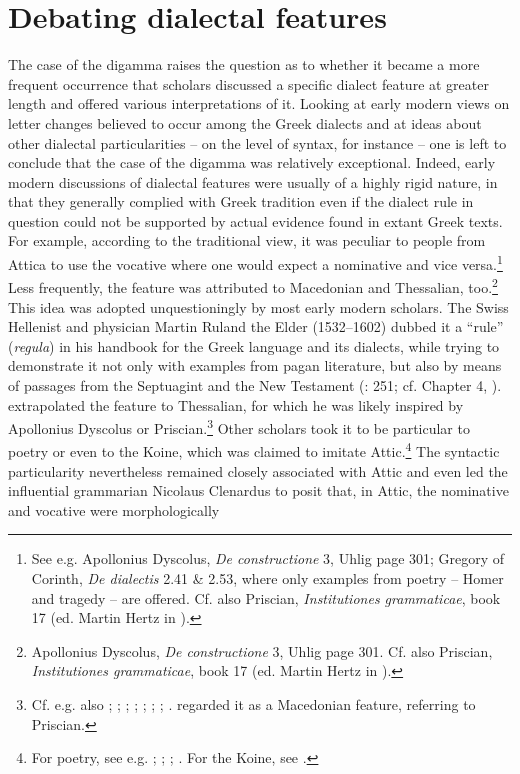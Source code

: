 \section{Debating dialectal features}\label{sec:6.4}

The case of the digamma raises the question as to whether it became a more frequent occurrence that scholars discussed a specific dialect feature at greater length and offered various interpretations of it. Looking at early modern views on letter changes believed to occur among the Greek dialects and at ideas about other dialectal particularities – on the level of syntax, for instance – one is left to conclude that the case of the digamma was relatively exceptional. Indeed, early modern discussions of dialectal features were usually of a highly rigid nature, in that they generally complied with Greek tradition even if the dialect rule in question could not be supported by actual evidence found in extant Greek texts. For example, according to the traditional view, it was peculiar to people from Attica to use the vocative where one would expect a nominative and vice versa.\footnote{See e.g. Apollonius Dyscolus, \textit{De constructione} 3, Uhlig page 301; Gregory of Corinth, \textit{De dialectis} 2.41 \& 2.53, where only examples from poetry – Homer and tragedy – are offered. Cf. also Priscian, \textit{Institutiones grammaticae}, book 17 (ed. Martin Hertz in \citealt[208]{Keil1859}).} Less frequently, the feature was attributed to Macedonian and Thessalian, too.\footnote{Apollonius Dyscolus, \textit{De constructione} 3, Uhlig page 301. Cf. also Priscian, \textit{Institutiones grammaticae}, book 17 (ed. Martin Hertz in \citealt[208]{Keil1859}).} This idea was adopted unquestioningly by most early modern scholars. The Swiss Hellenist and physician Martin Ruland the Elder (1532–1602) dubbed it a “rule” (\textit{regula}) in his handbook for the Greek language and its dialects, while trying to demonstrate it not only with examples from pagan literature, but also by means of passages from the Septuagint and the New Testament (\citealt{Ruland1556}: 251; cf. Chapter 4, ). \citet[302]{Ruland1556} extrapolated the feature to Thessalian, for which he was likely inspired by Apollonius Dyscolus or Priscian.\footnote{Cf. e.g. also ; \citet[216]{Vergara1537}; \citet[50\textsc{\textsuperscript{v}}]{Nunez1555}; \citet[\textsc{x.1}\textsc{\textsuperscript{v}}]{Dabercusius1577}; \citet[5, second pagination sequence]{Rhenius1626}; \citet[8--9]{Pasor1632}; \citet[85-87]{Wyss1650}; \citet[88]{Leusden1670}. \citet[\textsc{b.3}\textsc{\textsuperscript{r}}]{Kirchmaier1709} regarded it as a Macedonian feature, referring to Priscian.} Other scholars took it to be particular to poetry or even to the Koine, which was claimed to imitate Attic.\footnote{For poetry, see e.g. \citet[\textsc{q.}i\textsc{\textsuperscript{v}}]{Amerot1520}; \citet[129]{Antesignanus1554}; \citet[34]{Gretser1593}; \citet[157]{Schmidt1604}. For the Koine, see \citet[54]{Lancelot1655}.} The syntactic particularity nevertheless remained closely associated with Attic and even led the influential grammarian Nicolaus Clenardus to posit that, in Attic, the nominative and vocative were morphologically 